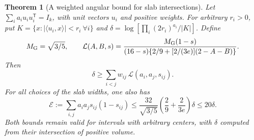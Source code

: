 \documentclass[11pt,a4paper]{article}
\newtheorem{theorem}{Theorem}[section]
\theoremstyle{remark}\newtheorem{remark}[theorem]{Remark}
\numberwithin{equation}{section}
\begin{document}
\begin{theorem}[A weighted angular bound for slab intersections]
\label{thm:incidence}
Let \(\sum_i a_i u_i u_i^{\mathsf T}=I_k\), with unit vectors \(u_i\)
and positive weights. For arbitrary \(r_i>0\), put
\(K=\{x:|\langle u_i,x\rangle|<r_i\ \forall i\}\) and
\(\delta=\log[\prod_i(2r_i)^{a_i}/|K|]\). Define
\[
 M_{\rm G}=\sqrt{3/5},\qquad
 \mathcal L(A,B,s)=
 \frac{M_{\rm G}(1-s)}
 {(16-s)\{2/9+[2/(3e)](2-A-B)\}}.
\]
Then
\begin{equation}\label{eq:incidence-bound}
 \delta\ge\sum_{i<j} w_{ij}\,\mathcal L(a_i,a_j,s_{ij}).
\end{equation}
For all choices of the slab widths, one also has
\[
 \mathcal E:=\sum_{i,j}a_i a_js_{ij}(1-s_{ij})
 \le \frac{32}{\sqrt{3/5}}\left(\frac29+\frac2{3e}\right)\delta
 \le 20\delta .
\]
Both bounds remain valid for intervals with arbitrary centers, with
\(\delta\) computed from their intersection of positive volume.
\end{theorem}
\end{document}
